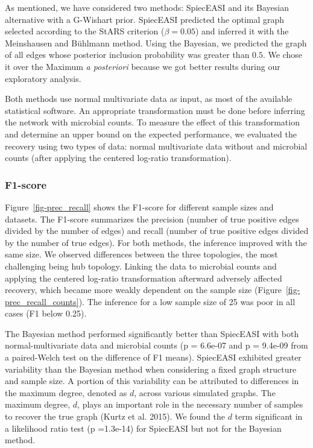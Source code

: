 \documentclass[
  a4paper,
]{article}
\begin{document}
As mentioned, we have considered two methods: SpiecEASI and its Bayesian
alternative with a G-Wishart prior. SpiecEASI predicted the optimal
graph selected according to the StARS criterion (\(\beta=0.05\)) and
inferred it with the Meinshausen and Bühlmann method. Using the
Bayesian, we predicted the graph of all edges whose posterior inclusion
probability was greater than \(0.5\). We chose it over the Maximum
\emph{a posteriori} because we got better results during our exploratory
analysis.

Both methods use normal multivariate data as input, as most of the
available statistical software. An appropriate transformation must be
done before inferring the network with microbial counts. To measure the
effect of this transformation and determine an upper bound on the
expected performance, we evaluated the recovery using two types of data:
normal multivariate data without and microbial counts (after applying
the centered log-ratio transformation).

\hypertarget{f1-score}{%
\subsubsection{F1-score}\label{f1-score}}

Figure~\ref{fig-prec_recall} shows the F1-score for different sample
sizes and datasets. The F1-score summarizes the precision (number of
true positive edges divided by the number of edges) and recall (number
of true positive edges divided by the number of true edges). For both
methods, the inference improved with the same size. We observed
differences between the three topologies, the most challenging being hub
topology. Linking the data to microbial counts and applying the centered
log-ratio transformation afterward adversely affected recovery, which
became more weakly dependent on the sample size
(Figure~\ref{fig-prec_recall_counts}). The inference for a low sample
size of 25 was poor in all cases (F1 below 0.25).

The Bayesian method performed significantly better than SpiecEASI with
both normal-multivariate data and microbial counts (p = 6.6e-07 and p =
9.4e-09 from a paired-Welch test on the difference of F1 means).
SpiecEASI exhibited greater variability than the Bayesian method when
considering a fixed graph structure and sample size. A portion of this
variability can be attributed to differences in the maximum degree,
denoted as \(d\), across various simulated graphs. The maximum degree,
\(d\), plays an important role in the necessary number of samples to
recover the true graph (Kurtz et al. 2015). We found the \(d\) term
significant in a likelihood ratio test (p =1.3e-14) for SpiecEASI but
not for the Bayesian method.
\end{document}
